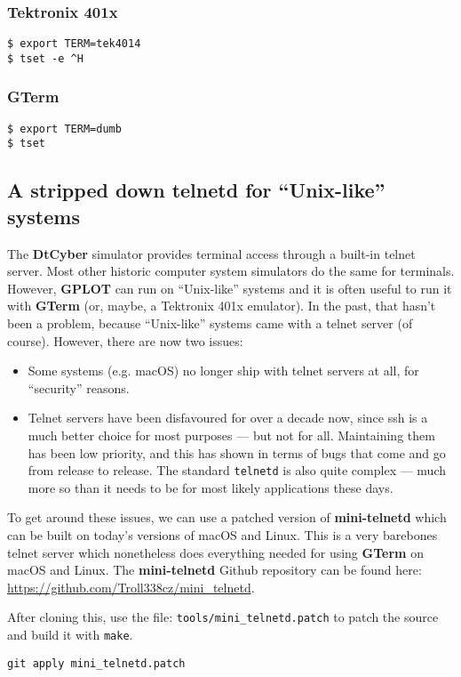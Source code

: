 \documentclass[a4paper,twoside,11pt]{article}
\newcommand{\newpara}{\par\vspace{4mm}\noindent}
\begin{document}
\subsubsection{Tektronix 401x}
\begin{lstlisting}
$ export TERM=tek4014
$ tset -e ^H
\end{lstlisting}

\subsubsection{GTerm}
\begin{lstlisting}
$ export TERM=dumb
$ tset
\end{lstlisting}

\subsection{A stripped down telnetd for ``Unix-like'' systems}
\newpara
The \textbf{DtCyber} simulator provides terminal access through a built-in telnet server. Most other historic computer system simulators
do the same for terminals. However, \textbf{GPLOT} can run on ``Unix-like'' systems and it is often useful to run it with
\textbf{GTerm} (or, maybe, a Tektronix 401x emulator). In the past, that hasn't been a problem, because ``Unix-like'' systems
came with a telnet server (of course). However, there are now two issues:
\begin{itemize}
\item Some systems (e.g. macOS) no longer ship with telnet servers at all, for ``security'' reasons.
\item Telnet servers have been disfavoured for over a decade now, since ssh is a much better choice for most purposes --- but
  not for all. Maintaining them has been low priority, and this has shown in terms of bugs that come and go from release to
  release. The standard \texttt{telnetd} is also quite complex --- much more so than it needs to be for most likely applications
  these days.
\end{itemize}

\newpara
To get around these issues, we can use a patched version
of \textbf{mini-telnetd} which can be built on today's versions of macOS and Linux.
This is a very barebones telnet server which nonetheless does everything needed for using \textbf{GTerm} on macOS and Linux.
The \textbf{mini-telnetd} Github repository can be found here: \url{https://github.com/Troll338cz/mini_telnetd}.

\newpara
After cloning this, use the file: \texttt{tools/mini\_telnetd.patch} to patch the source and build it with \texttt{make}.
\begin{lstlisting}
git apply mini_telnetd.patch
\end{lstlisting}
\end{document}
